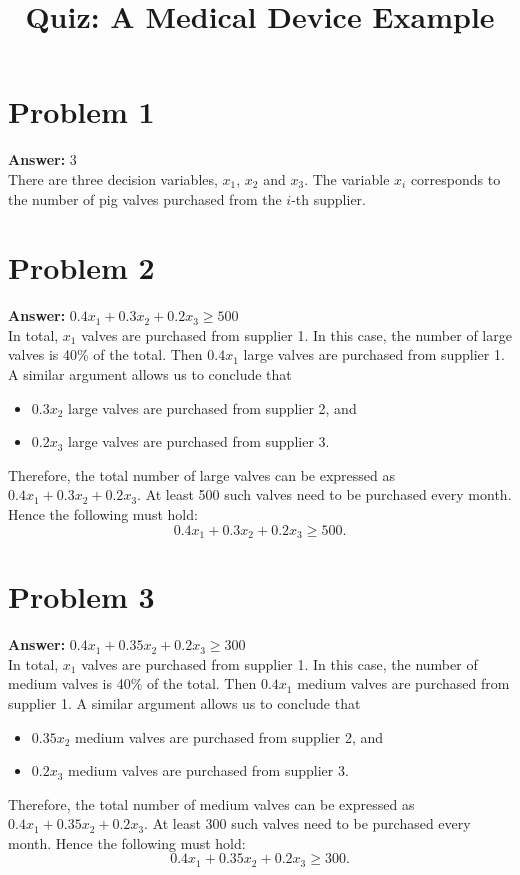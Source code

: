 \documentclass[11pt]{article}
\date{}
\title{Quiz: A Medical Device Example}
\begin{document}
\thispagestyle{empty}
\pagestyle{empty}
\section*{Problem 1}
\label{sec:orge3a5f91}

\textbf{Answer:} 3\\

There are three decision variables, \(x_1\), \(x_2\) and \(x_3\). The
variable \(x_i\) corresponds to the number of pig valves purchased from the
\(i\)-th supplier.
\section*{Problem 2}
\label{sec:orge7857ab}

\textbf{Answer:} \(0.4x_1+0.3x_2+0.2x_3\geq 500\)\\

In total, \(x_1\) valves are purchased from supplier 1. In this case, the
number of large valves is 40\% of the total. Then \(0.4x_1\) large valves are
purchased from supplier 1. A similar argument allows us to conclude that
\begin{itemize}
\item \(0.3x_2\) large valves are purchased from supplier 2, and
\item \(0.2x_3\) large valves are purchased from supplier 3.
\end{itemize}
Therefore, the total number of large valves can be expressed as
\(0.4x_1+0.3x_2+0.2x_3\). At least 500 such valves need to be purchased every
month. Hence the following must hold:
\begin{equation}
0.4x_1+0.3x_2+0.2x_3\geq 500.
\end{equation}
\section*{Problem 3}
\label{sec:org4c5cbda}

\textbf{Answer:} \(0.4x_1+0.35x_2+0.2x_3\geq 300\)\\

In total, \(x_1\) valves are purchased from supplier 1. In this case, the
number of medium valves is 40\% of the total. Then \(0.4x_1\) medium valves are
purchased from supplier 1. A similar argument allows us to conclude that
\begin{itemize}
\item \(0.35x_2\) medium valves are purchased from supplier 2, and
\item \(0.2x_3\) medium valves are purchased from supplier 3.
\end{itemize}
Therefore, the total number of medium valves can be expressed as
\(0.4x_1+0.35x_2+0.2x_3\). At least 300 such valves need to be purchased every
month. Hence the following must hold:
\begin{equation}
0.4x_1+0.35x_2+0.2x_3\geq 300.
\end{equation}
\end{document}
